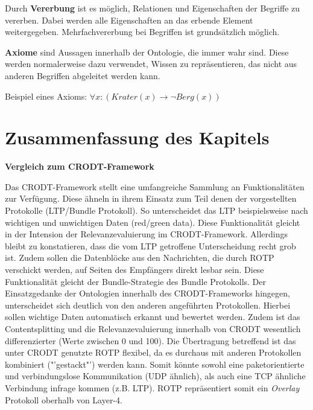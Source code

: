  Durch \textbf{Vererbung} ist es m{\"o}glich, Relationen und Eigenschaften der
 Begriffe zu vererben. Dabei werden alle Eigenschaften an das erbende Element
 weitergegeben. Mehrfachvererbung bei Begriffen ist grunds{\"a}tzlich
 m{\"o}glich.
 
 \textbf{Axiome} sind Aussagen innerhalb der Ontologie, die immer wahr sind.
 Diese werden normalerweise dazu verwendet, Wissen zu repr{\"a}sentieren, das
 nicht aus anderen Begriffen abgeleitet werden kann.
 
 Beispiel eines Axioms:\newline
 $\forall x : (Krater(x) \rightarrow \neg Berg(x))$   
      
\section{Zusammenfassung des Kapitels}
      
\textbf{Vergleich zum CRODT-Framework}

Das \gls{CRODT}-Framework stellt eine umfangreiche Sammlung an Funktionalit{\"a}ten
zur Verf{\"u}gung. Diese {\"a}hneln in ihrem Einsatz zum Teil denen der
vorgestellten Protokolle (\gls{LTP}/Bundle Protokoll). So unterscheidet das \gls{LTP}
beispielsweise nach wichtigen und unwichtigen Daten (red/green data). Diese
Funktionalit{\"a}t gleicht in der Intension der Relevanzevaluierung im
\gls{CRODT}-Framework. Allerdings bleibt zu konstatieren, dass die vom \gls{LTP} getroffene
Unterscheidung recht grob ist. Zudem sollen die
Datenbl{\"o}cke aus den Nachrichten, die durch \gls{ROTP} verschickt werden, auf
Seiten des Empf{\"a}ngers direkt lesbar sein. Diese Funktionalit{\"a}t gleicht der
Bundle-Strategie des Bundle Protokolls. Der Einsatzgedanke der Ontologien
innerhalb des \gls{CRODT}-Frameworks hingegen, unterscheidet sich deutlich von den
anderen angef{\"u}hrten Protokollen. Hierbei sollen wichtige Daten automatisch
erkannt und bewertet werden. Zudem ist das Contentsplitting und die
Relevanzevaluierung innerhalb von \gls{CRODT} wesentlich differenzierter (Werte
zwischen 0 und 100). Die {\"U}bertragung betreffend ist das unter \gls{CRODT}
genutzte \gls{ROTP} flexibel, da es durchaus mit anderen Protokollen kombiniert
("'gestackt"') werden kann. Somit k{\"o}nnte sowohl eine paketorientierte und
verbindungslose Kommunikation (\gls{UDP} {\"a}hnlich), als auch eine \gls{TCP}
{\"a}hnliche Verbindung infrage kommen (z.B. \gls{LTP}). \gls{ROTP} repr{\"a}sentiert somit ein
\textit{Overlay} Protokoll oberhalb von Layer-4. 

